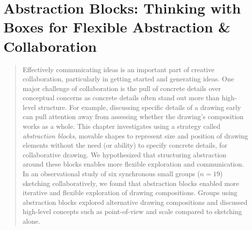 


\chapter{Abstraction Blocks: Thinking with Boxes for Flexible Abstraction \& Collaboration}
\label{chapter:abstraction}
\begin{quote}
Effectively communicating ideas is an important part of creative collaboration, particularly in getting started and generating ideas. One major challenge of collaboration is the pull of concrete details over conceptual concerns as concrete details often stand out more than high-level structure. For example, discussing specific details of a drawing early can pull attention away from assessing whether the drawing's composition works as a whole. This chapter investigates using a strategy called \textit{abstraction blocks}, movable shapes to represent size and position of drawing elements without the need (or ability) to specify concrete details, for collaborative drawing. We hypothesized that structuring abstraction around these blocks enables more flexible exploration and communication. In an observational study of six synchronous small groups ($n=19$) sketching collaboratively, we found that abstraction blocks enabled more iterative and flexible exploration of drawing compositions. Groups using abstraction blocks explored alternative drawing compositions and discussed high-level concepts such as point-of-view and scale compared to sketching alone.
\end{quote}





